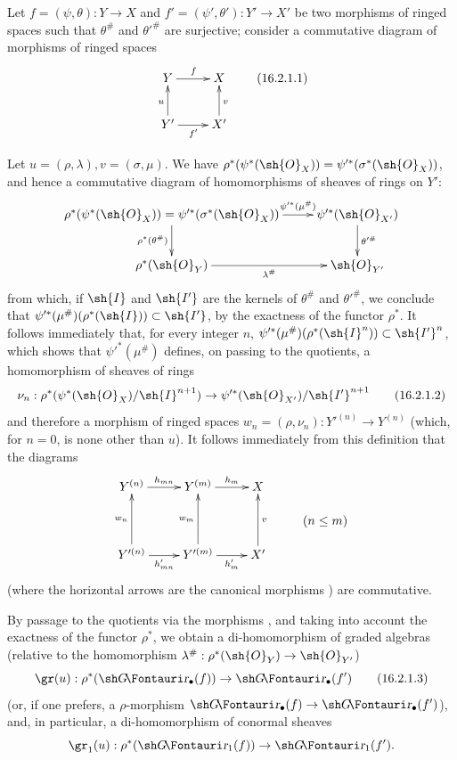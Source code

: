 \begin{env}[16.2.1]
\label{IV.16.2.1}
Let $f = (\psi, \theta): Y \to X$ and $f' = (\psi', \theta'): Y' \to X'$ be two morphisms of ringed spaces such that $\theta^\#$ and $\theta'^\#$ are surjective;
consider a commutative diagram of morphisms of ringed spaces
\[
  \label{IV.16.2.1.1}
  \xymatrix{
    Y \ar[r]^f & X \\
    Y'\ar[r]_{f'} \ar[u]^u & X'\ar[u]_v  
  }
  \tag{16.2.1.1}
\]

Let $u = (\rho, \lambda), v = (\sigma, \mu)$. 
We have $\rho^*(\psi^*(\sh{O}_X)) = \psi'^*(\sigma^*(\sh{O}_X))$, and hence a commutative diagram of homomorphisms of sheaves of rings on $Y'$:
\[
  \xymatrix{
    \rho^*(\psi^*(\sh{O}_X)) = \psi'^*(\sigma^*(\sh{O}_X)) \ar[r]^-{\psi'^*(\mu^\#)}\ar[d]_{\rho^*(\theta^\#)} & \psi'^*(\sh{O}_{X'}) \ar[d]^{\theta'^\#} \\
    \rho^*(\sh{O}_Y)\ar[r]_-{\lambda^\#}  & \sh{O}_{Y'}  
  }
\]
from which, if $\sh{I}$ and $\sh{I'}$ are the kernels of $\theta^\#$ and $\theta'^\#$, we conclude that $\psi'^*(\mu^\#)(\rho^*(\sh{I})) \subset \sh{I'}$, by the exactness of the functor $\rho^*$.
It follows immediately that, for every integer $n$, $\psi'^*(\mu^\#)(\rho^*(\sh{I}^n)) \subset \sh{I'}^n$, which shows that $\psi'^*(\mu^\#)$ defines, on passing to the quotients, a homomorphism of sheaves of rings
\[
  \label{IV.16.2.1.2}
  \nu_n: \rho^*(\psi^*(\sh{O}_X)/\sh{I}^{n+1}) \to \psi'^*(\sh{O}_{X'})/\sh{I'}^{n+1}
  \tag{16.2.1.2}
\]
and therefore a morphism of ringed spaces $w_n = (\rho, \nu_n): Y'^{(n)} \to Y^{(n)}$ (which, for $n = 0$, is none other than $u$).
It follows immediately from this definition that the diagrams
\[
  \xymatrix@R=1pc{
    Y^{(n)} \ar[r]^-{h_{mn}} & Y^{(m)} \ar[r]^-{h_m} & X \\
    & & & (n \leq m) \\
    Y'^{(n)} \ar[r]_-{h'_{mn}} \ar[uu]^-{w_n} & Y'^{(m)} \ar[r]_-{h'_m} \ar[uu]^-{w_m} & X' \ar[uu]_-v \\
  }
\]
(where the horizontal arrows are the canonical morphisms ) are commutative.

By passage to the quotients via the morphisms , and taking into
account the exactness of the functor $\rho^*$, we obtain a di-homomorphism of graded algebras (relative to the homomorphism $\lambda^\#: \rho^*(\sh{O}_Y) \to \sh{O}_{Y'}$)
\[
  \label{IV.16.2.1.3}
  \gr(u): \rho^*(\shGr_\bullet(f)) \to \shGr_\bullet(f')
  \tag{16.2.1.3}
\]
(or, if one prefers, a $\rho$-morphism  $\shGr_\bullet(f) \to \shGr_\bullet(f')$), and, in particular, a di-homomorphism of conormal sheaves
\[
  \gr_1(u): \rho^*(\shGr_1(f)) \to \shGr_1(f').
\]


\end{env}
